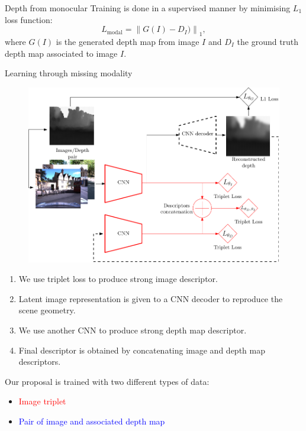 \documentclass[final]{beamer}
\newlength{\colwidth}
\newcommand{\norm}[1]{\left\lVert#1\right\rVert}
\begin{document}
\begin{frame}[t]
\begin{columns}[t]
\begin{column}{\colwidth}
\begin{block}{Depth from monocular}
	Training is done in a supervised manner by minimising $L_1$ loss function:
	\begin{equation*}
     	L_{\mathrm{modal}} = \norm{G(I) - D_I)}_1,
	\end{equation*}
where $G(I)$ is the generated depth map from image $I$ and  $D_I$ the ground truth depth map associated to image $I$.
  \end{block}

  \begin{block}{Learning through missing modality}
    \begin{figure}
		\centering
		\includegraphics[width=\linewidth]{vect/method/fig3/5}	    
    \end{figure}
    
    \begin{enumerate}
      \item We use triplet loss to produce strong image descriptor.
      \item Latent image representation is given to a CNN decoder to reproduce the scene geometry.
      \item We use another CNN to produce strong depth map descriptor.
      \item Final descriptor is obtained by concatenating image and depth map descriptors.
    \end{enumerate}        
    
    Our proposal is trained with two different types of data:
    \begin{itemize}
    	\item \textcolor{red}{Image triplet}
    	\item \textcolor{blue}{Pair of image and associated depth map}
    \end{itemize}
  \end{block}


\end{column}
\end{columns}
\end{frame}
\end{document}
